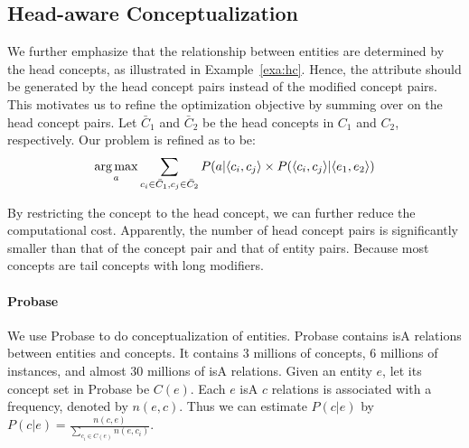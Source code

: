 \subsection{Head-aware Conceptualization}
We further emphasize that the relationship between entities are determined by the head concepts, as illustrated in Example~\ref{exa:hc}.
Hence, the attribute should be generated by the head concept pairs instead of the modified concept pairs.
This motivates us to refine the optimization objective by summing over on the head concept pairs.
Let $\bar{C}_1$ and $\bar{C}_2$ be the head concepts in  $C_1$ and $C_2$, respectively.
Our problem is refined as to be:
\begin{equation}
\label{eq:target_head}
\small
\argmax_a \sum_{c_i\in \bar{C}_1 , c_j \in \bar{C}_2 } P(a|\langle c_{i},c_{j} \rangle \times P(\langle c_{i},c_{j}\rangle|\langle e_{1},e_{2}\rangle)
\end{equation}

By restricting the concept to the head concept, we can further reduce the computational cost.
Apparently, the number of head concept pairs is significantly smaller than that of the concept pair and that of entity pairs.
Because most concepts are tail concepts with long modifiers.


\vspace{-4mm}
\paragraph*{Probase}
We use Probase to do conceptualization of entities. 
Probase contains isA relations between entities and concepts. It contains 3 millions of concepts, 6 millions of instances, and almost 30 millions of isA relations.
Given an entity $e$, let its concept set in Probase be $C(e)$.
Each $e$ isA $c$ relations is associated with a frequency, denoted by $n(e, c)$.
Thus we can estimate  $P(c|e)$ by
$P(c|e)=\frac{n(c,e)}{\sum_{c_i\in C(e)}n(e, c_i)}$.

